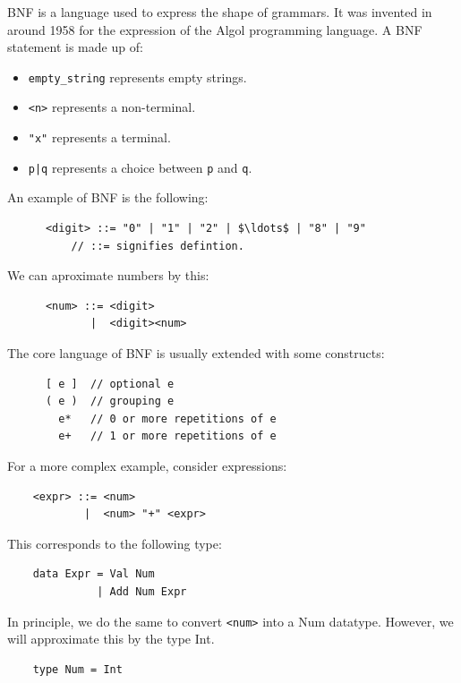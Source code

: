 \documentclass[a4paper,12pt]{article}
\theoremstyle{remark}
\begin{document}
  BNF is a language used to express the shape of grammars. It was invented in around
  1958 for the expression of the Algol programming language. A BNF statement is made
  up of:

  \begin{itemize}
    \item \lstinline{empty_string} represents empty strings.
    \item \lstinline{<n>} represents a non-terminal.
    \item \lstinline{"x"} represents a terminal.
    \item \lstinline{p|q} represents a choice between \lstinline{p} and \lstinline{q}.
  \end{itemize}

  An example of BNF is the following:

  \begin{lstlisting}
      <digit> ::= "0" | "1" | "2" | $\ldots$ | "8" | "9"
          // ::= signifies defintion.  \end{lstlisting}

  We can aproximate numbers by this:

  \begin{lstlisting}
      <num> ::= <digit>
             |  <digit><num>  \end{lstlisting}

  The core language of BNF is usually extended with some constructs:

  \begin{lstlisting}
      [ e ]  // optional e
      ( e )  // grouping e
        e*   // 0 or more repetitions of e
        e+   // 1 or more repetitions of e  \end{lstlisting}

For a more complex example, consider expressions:

\begin{lstlisting}
    <expr> ::= <num>
            |  <num> "+" <expr>  \end{lstlisting}

This corresponds to the following type:

\begin{lstlisting}
    data Expr = Val Num
              | Add Num Expr  \end{lstlisting}

In principle, we do the same to convert \lstinline{<num>} into a Num datatype. However,
we will approximate this by the type Int.

\begin{lstlisting}
    type Num = Int  \end{lstlisting}
\end{document}
